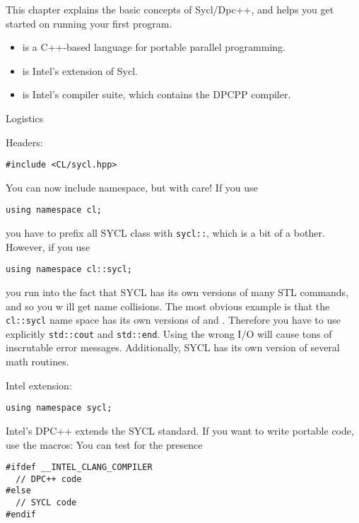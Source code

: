 
This chapter explains the basic concepts of Sycl/Dpc++,
and helps you get
started on running your first program.

\begin{itemize}
\item {} is a C++-based language for portable parallel programming.
\item {} is Intel's extension of Sycl.
\item {} is Intel's compiler suite,
  which contains the \ac{DPCPP} compiler.
\end{itemize}

 {Logistics}

Headers:
\begin{lstlisting}
#include <CL/sycl.hpp>
\end{lstlisting}

You can now include namespace, but with care!
If you use
\begin{lstlisting}
using namespace cl;
\end{lstlisting}
you have to prefix all SYCL class with \lstinline+sycl::+,
which is a bit of a bother.
However, if you use
\begin{lstlisting}
using namespace cl::sycl;
\end{lstlisting}
you run into the fact that SYCL has its own versions of many \ac{STL}
commands, and so you w
ill get name collisions.
The most obvious example is that 
the \lstinline+cl::sycl+ name space has its own versions of  and .
Therefore you have to use explicitly \lstinline+std::cout+ and \lstinline+std::end+.
Using the wrong I/O will cause tons of inscrutable error messages.
Additionally, SYCL has its own version of several math routines.

Intel extension:
\begin{lstlisting}
using namespace sycl;
\end{lstlisting}

\begin{dpcppnote}
  Intel's DPC++ extends the SYCL standard. If you want to write portable code,
  use the  macros:
You can test for the presence
\begin{lstlisting}
#ifdef __INTEL_CLANG_COMPILER
  // DPC++ code
#else
  // SYCL code
#endif
\end{lstlisting}
\end{dpcppnote}

